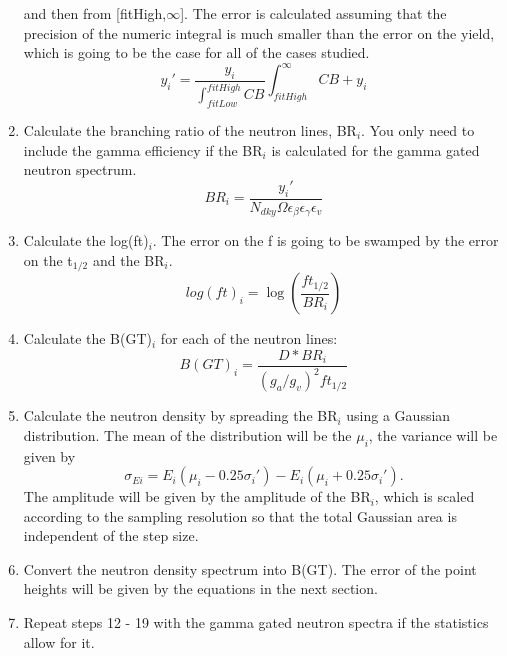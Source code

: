 \begin{enumerate}
  and then from [fitHigh,$\infty$]. The error is calculated assuming that the 
  precision of the numeric integral is much smaller than the error on the yield, 
  which is going to be the case for all of the cases studied.
  \begin{equation}
    y_i' = \frac{y_i}{\int_{fitLow}^{fitHigh}CB}\int_{fitHigh}^{\infty}CB + y_i
    \label{eqn:fullYld}
  \end{equation}
\item Calculate the branching ratio of the neutron lines, BR$_i$. You only need 
  to include the gamma efficiency if the BR$_i$ is calculated for the gamma 
  gated neutron spectrum.
  \begin{equation}
    BR_i = \frac{y_i'}{N_{dky} \Omega \epsilon_\beta \epsilon_\gamma \epsilon_v}
    \label{eqn:brCalc}
  \end{equation}
\item Calculate the log(ft)$_i$. The error on the f is going to be swamped by the 
  error on the t$_{1/2}$ and the BR$_i$. 
  \begin{equation}
    log(ft)_i = \log\left(\frac{f t_{1/2}}{BR_i}\right)
    \label{eqn:logft}
  \end{equation}
\item Calculate the B(GT)$_i$ for each of the neutron lines:
  \begin{equation}
    B(GT)_i = \frac{D*BR_i}{(g_a/g_v)^2f t_{1/2}}
    \label{eqn:bgt}
  \end{equation}
\item Calculate the neutron density by spreading the BR$_i$ using a Gaussian 
  distribution. The mean of the distribution will be the $\mu_i$, the variance 
  will be given by 
  \begin{equation}
    \sigma_{Ei} = E_i(\mu_i - 0.25\sigma_{i}') - E_i(\mu_i + 0.25\sigma_{i}').
    \label{eqn:bgtWidth}
  \end{equation}
  The amplitude will be given by the amplitude of the BR$_i$, which is 
  scaled according to the sampling resolution so that the total Gaussian 
  area is independent of the step size.
\item Convert the neutron density spectrum into B(GT). The error of the point 
  heights will be given by the equations in the next section. 
\item Repeat steps 12 - 19 with the gamma gated neutron spectra if the statistics
  allow for it.
\end{enumerate}


